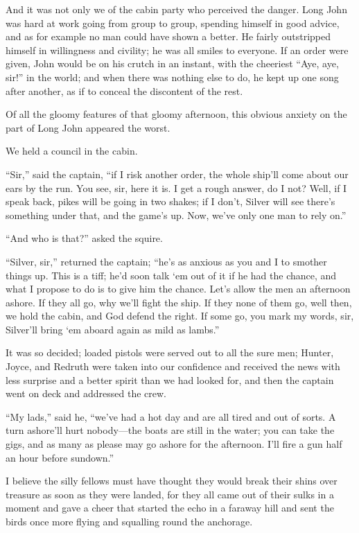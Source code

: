 And it was not only we of the cabin party who perceived the danger. Long John was hard at work going from group to group, spending himself in good advice, and as for example no man could have shown a better. He fairly outstripped himself in willingness and civility; he was all smiles to everyone. If an order were given, John would be on his crutch in an instant, with the cheeriest \enquote{Aye, aye, sir!} in the world; and when there was nothing else to do, he kept up one song after another, as if to conceal the discontent of the rest.

Of all the gloomy features of that gloomy afternoon, this obvious anxiety on the part of Long John appeared the worst.

We held a council in the cabin.

\enquote{Sir,} said the captain, \enquote{if I risk another order, the whole ship’ll come about our ears by the run. You see, sir, here it is. I get a rough answer, do I not? Well, if I speak back, pikes will be going in two shakes; if I don’t, Silver will see there’s something under that, and the game’s up. Now, we’ve only one man to rely on.}

\enquote{And who is that?} asked the squire.

\enquote{Silver, sir,} returned the captain; \enquote{he’s as anxious as you and I to smother things up. This is a tiff; he’d soon talk `em out of it if he had the chance, and what I propose to do is to give him the chance. Let’s allow the men an afternoon ashore. If they all go, why we’ll fight the ship. If they none of them go, well then, we hold the cabin, and God defend the right. If some go, you mark my words, sir, Silver’ll bring `em aboard again as mild as lambs.}

It was so decided; loaded pistols were served out to all the sure men; Hunter, Joyce, and Redruth were taken into our confidence and received the news with less surprise and a better spirit than we had looked for, and then the captain went on deck and addressed the crew.

\enquote{My lads,} said he, \enquote{we’ve had a hot day and are all tired and out of sorts. A turn ashore’ll hurt nobody---the boats are still in the water; you can take the gigs, and as many as please may go ashore for the afternoon. I’ll fire a gun half an hour before sundown.}

I believe the silly fellows must have thought they would break their shins over treasure as soon as they were landed, for they all came out of their sulks in a moment and gave a cheer that started the echo in a faraway hill and sent the birds once more flying and squalling round the anchorage.

